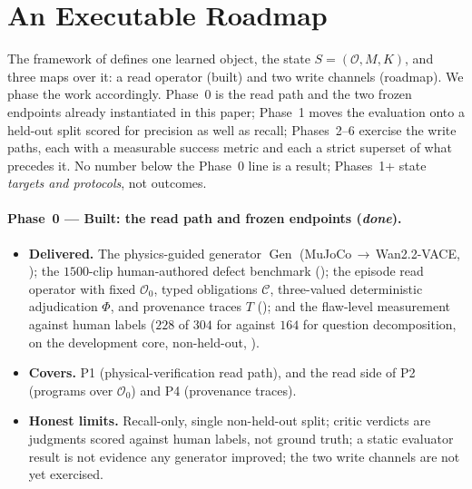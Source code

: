 \section{An Executable Roadmap}
\label{sec:roadmap}

The framework of  defines one learned object, the state
$S=(\mathcal{O},M,K)$, and three maps over it: a read operator (built) and two write
channels (roadmap). We phase the work accordingly. Phase~0 is the read path and
the two frozen endpoints already instantiated in this paper; Phase~1 moves the
evaluation onto a held-out split scored for precision as well as recall;
Phases~2--6 exercise
the write paths, each with a measurable success metric and each a strict
superset of what precedes it. No number below the Phase~0 line is a result;
Phases~1+ state \emph{targets and protocols}, not outcomes.

\paragraph{Phase~0 --- Built: the read path and frozen endpoints (\emph{done}).}
\begin{itemize}
  \item \textbf{Delivered.} The physics-guided generator $\operatorname{Gen}$
    (MuJoCo\,$\rightarrow$\,Wan2.2-VACE, ); the $1500$-clip
    human-authored defect benchmark (); the episode read
    operator with fixed $\mathcal{O}_0$, typed obligations $\mathcal{C}$, three-valued
    deterministic adjudication $\Phi$, and provenance traces $T$
    (); and the flaw-level measurement against human labels
    ($228$ of $304$ for \PhyReAct{} against $164$ for question decomposition, on
    the development core, non-held-out, ).
  \item \textbf{Covers.} P1 (physical-verification read path), and the read side of
    P2 (programs over $\mathcal{O}_0$) and P4 (provenance traces).
  \item \textbf{Honest limits.} Recall-only, single non-held-out split; critic
    verdicts are judgments scored against human labels, not ground truth; a
    static evaluator result is not evidence any generator improved; the two
    write channels are not yet exercised.
\end{itemize}

